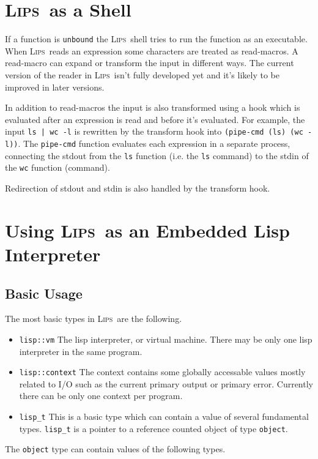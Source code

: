 \documentclass[a4paper]{article}
\newcommand{\lips}{\textsc{Lips}}
\newcommand{\lisp}[1]{\texttt{#1}}
\newcommand{\cpp}[1]{\texttt{#1}}
\begin{document}
\section{\lips\ as a Shell}
If a function is \lisp{unbound} the \lips\ shell tries to run the
function as an executable.  When \lips\ reads an expression some
characters are treated as read-macros.  A read-macro can expand or
transform the input in different ways.  The current version of the
reader in \lips\ isn't fully developed yet and it's likely to be
improved in later versions.

In addition to read-macros the input is also transformed using a hook
which is evaluated after an expression is read and before it's
evaluated.  For example, the input \lisp{ls | wc -l} is rewritten by
the transform hook into \lisp{(pipe-cmd (ls) (wc -l))}.  The
\lisp{pipe-cmd} function evaluates each expression in a separate
process, connecting the stdout from the \lisp{ls} function (i.e. the
\lisp{ls} command) to the stdin of the \lisp{wc} function (command).

Redirection of stdout and stdin is also handled by the transform hook.

\section{Using \lips\ as an Embedded Lisp Interpreter}
\subsection{Basic Usage}
The most basic types in \lips\ are the following.
\begin{itemize}
  \item \cpp{lisp::vm} The lisp interpreter, or virtual machine. There
    may be only one lisp interpreter in the same program.
  \item \cpp{lisp::context} The context contains some globally
    accessable values mostly related to I/O such as the current
    primary output or primary error. Currently there can be only one
    context per program.
  \item \cpp{lisp\_t} This is a basic type which can contain a value
    of several fundamental types. \cpp{lisp\_t} is a pointer to a
    reference counted object of type \cpp{object}.
\end{itemize}

The \cpp{object} type can contain values of the following types.
\end{document}
